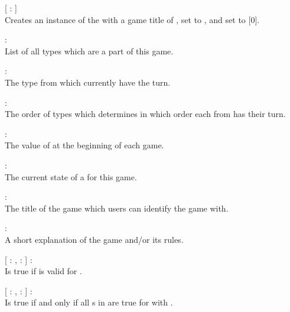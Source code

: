 \begin{dlist}
  \item {}[ : ]\\
  Creates an instance of the  with a game title of
  ,  set to , and
   set to [0].
  
  \item {} : \\
  List of all  types which are a part of this game.
  
  \item {} : \\
  The  type from  which currently have the turn.
  
  \item {} : \\
  The order of  types which determines in which order each
   from  has their turn.
  
  \item {} : \\
  The value of  at the beginning of each game.
  
  \item {} : \\
  The current state of a  for this game.
  
  \item {} : \\
  The title of the game which users can identify the game with.
  
  \item {} : \\
  A short explanation of the game and/or its rules.
  
  \item {}[  : ,  :  ] : \\
  Is true if  is valid for .
  
  \item {}[  : ,  :  ] : \\
  Is true if and only if all s in  are true
  for  with .
  

\end{dlist}
